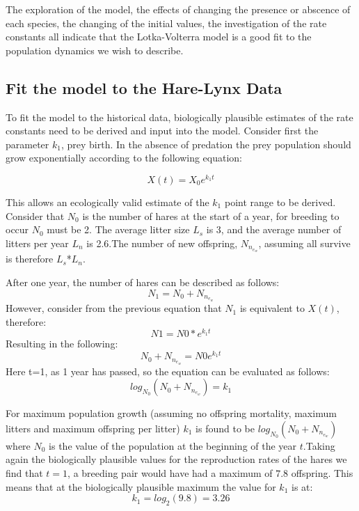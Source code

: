 \documentclass{article}
\begin{document}
The exploration of the model, the effects of changing the presence or abscence of each species, the changing of the initial values, the investigation of the rate constants all indicate that the Lotka-Volterra model is a good fit to the population dynamics we wish to describe.

\subsection{Fit the model to the Hare-Lynx Data}
To fit the model to the historical data, biologically plausible estimates of the rate constants need to be derived and input into the model. Consider first the parameter $k_1$, prey birth. In the absence of predation the prey population should grow exponentially according to the following equation: 

\begin{equation}
    X(t) = X_0e^{k_1t}
\end{equation}

This allows an ecologically valid estimate of the $k_1$ point range to be derived. Consider that $N_0$ is the number of hares at the start of a year, for breeding to occur $N_0$ must be 2. The average litter size $L_s$ is 3, and the average number of litters per year $L_n$ is 2.6.The number of new offspring, $N_n_e_w$, assuming all survive is therefore $L_s$*$L_n$.

After one year, the number of hares can be described as follows:
\begin{equation*}
    N_1 = N_0 + N_n_e_w
\end{equation*}
However, consider from the previous equation that $N_1$ is equivalent to $X(t)$, therefore:
\begin{equation*}
    N1 = N0 * e^{k_1t}
\end{equation*}
Resulting in the following:
\begin{equation*}
    N_0 + N_n_e_w = N0e^{k_1t}
\end{equation*}
Here t=1, as 1 year has passed, so the equation can be evaluated as follows: 
\begin{equation*}
    log_N_0(N_0 + N_n_e_w) = k_1
\end{equation*}

For maximum population growth (assuming no offspring mortality, maximum litters and maximum offspring per litter) $k_1$ is found to be $log_N_0(N_0 + N_n_e_w)$ where $N_0$ is the value of the population at the beginning of the year $t$.Taking again the biologically plausible values for the reproduction rates of the hares we find that $t = 1$, a breeding pair would have had a maximum of $7.8$ offspring. This means that at the biologically plausible maximum the value for $k_1$ is at:
\begin{equation}
    k_1 = log_2(9.8) = 3.26
\end{equation}
\end{document}
